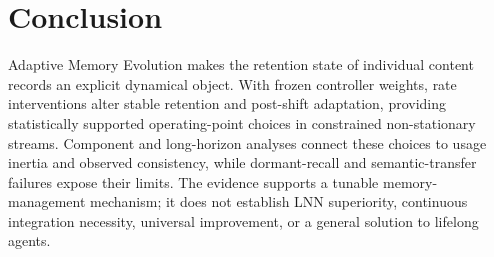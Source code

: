 \section{Conclusion}
Adaptive Memory Evolution makes the retention state of individual content records an explicit dynamical object. With frozen controller weights, rate interventions alter stable retention and post-shift adaptation, providing statistically supported operating-point choices in constrained non-stationary streams. Component and long-horizon analyses connect these choices to usage inertia and observed consistency, while dormant-recall and semantic-transfer failures expose their limits. The evidence supports a tunable memory-management mechanism; it does not establish LNN superiority, continuous integration necessity, universal improvement, or a general solution to lifelong agents.
